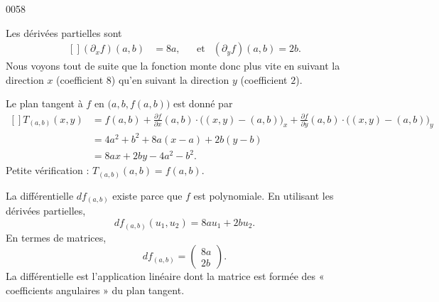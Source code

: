 
\begin{corrige}{0058}

Les dérivées partielles sont
\begin{equation}
	\begin{aligned}[]
		(\partial_xf)(a,b)&=8a,&&\text{et}&(\partial_yf)(a,b)=2b.
	\end{aligned}
\end{equation}
Nous voyons tout de suite que la fonction monte donc plus vite en suivant la direction $x$ (coefficient $8$) qu'en suivant la direction $y$ (coefficient $2$).

Le plan tangent à $f$ en $\big( a,b,f(a,b) \big)$ est donné par 
\begin{equation}
	\begin{aligned}[]
		T_{(a,b)}(x,y)	&=f(a,b)+\frac{ \partial f }{ \partial x }(a,b)\cdot\big( (x,y)-(a,b) \big)_x+\frac{ \partial f }{ \partial y }(a,b)\cdot\big( (x,y)-(a,b) \big)_y\\
				&=4a^2+b^2+8a(x-a)+2b(y-b)\\
				&=8ax+2by-4a^2-b^2.
	\end{aligned}
\end{equation}
Petite vérification : $T_{(a,b)}(a,b)=f(a,b)$.

La différentielle $df_{(a,b)}$ existe parce que $f$ est polynomiale. En utilisant les dérivées partielles,
\begin{equation}
	df_{(a,b)}(u_1,u_2)=8au_1+2bu_2.
\end{equation}
En termes de matrices,
\begin{equation}
	df_{(a,b)}=\begin{pmatrix}
	8a	\\ 
	2b	
\end{pmatrix}.
\end{equation}
La différentielle est l'application linéaire dont la matrice est formée des « coefficients angulaires » du plan tangent.


\end{corrige}
